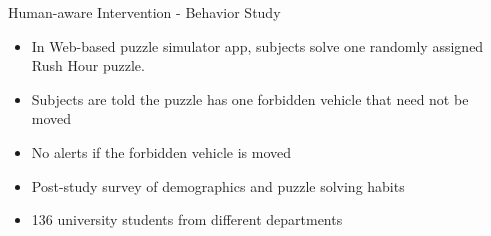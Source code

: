 \begin{frame}{Human-aware Intervention - Behavior Study}
\begin{itemize}
\item In Web-based puzzle simulator app, subjects solve one
randomly assigned Rush Hour puzzle.
\item Subjects are told the puzzle has one forbidden vehicle that
need not be moved
\item No alerts if the forbidden vehicle is moved
\item Post-study survey of demographics and puzzle solving habits
\item 136 university students from different
departments
\end{itemize}

\end{frame}